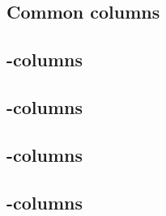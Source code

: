 \subsection{Common columns          }   %
\subsection{\computation{}-columns  }   %
\subsection{\macro{}-columns        }   %
\subsection{\extern{}-columns       }   %
\subsection{\utils{}-columns        }   %
